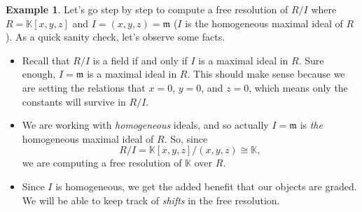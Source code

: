 \documentclass[12pt,a4paper]{article}
\newcommand{\KK}{\mathbb{K}}
\theoremstyle{definition}
\newtheorem{example}[theorem]{Example}
\numberwithin{equation}{section}
\begin{document}
\begin{example}
    Let's go step by step to compute a free resolution of $R/I$ where $R = \KK[x,y,z]$ and $I = (x, y, z) = \mathfrak{m}$ ($I$ is the homogeneous maximal ideal of $R$).
    As a quick sanity check, let's observe some facts.
    \begin{itemize}
        \item Recall that $R/I$ is a field if and only if $I$ is a maximal ideal in $R$.
        Sure enough, $I = \mathfrak{m}$ is a maximal ideal in $R$.
        This should make sense because we are setting the relations that $x = 0$, $y = 0$, and $z = 0$, which means only the constants will survive in $R/I$.

        \item We are working with \emph{homogeneous} ideals, and so actually $I = \mathfrak{m}$ is \emph{the} homogeneous maximal ideal of $R$.
        So, since
        \begin{equation*}
            R/I = \KK[x,y,z] / (x,y,z) \cong \KK,
        \end{equation*}
        we are computing a free resolution of $\KK$ over $R$.

        \item Since $I$ is homogeneous, we get the added benefit that our objects are graded.
        We will be able to keep track of \emph{shifts} in the free resolution.
    \end{itemize}


\end{example}
\end{document}

